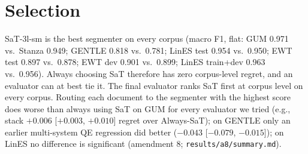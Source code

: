 
\section{Selection}
\label{app:selection}
SaT-3l-sm is the best segmenter on every corpus (macro F1, flat: GUM 0.971 vs.\ Stanza 0.949; GENTLE 0.818 vs.\ 0.781;
LinES test 0.954 vs.\ 0.950; EWT test 0.897 vs.\ 0.878; EWT dev 0.901 vs.\ 0.899; LinES train+dev 0.963 vs.\ 0.956).
Always choosing SaT therefore has zero corpus-level regret, and an evaluator can at best tie it. The final evaluator ranks
SaT first at corpus level on every corpus. Routing each document to the segmenter with the highest score does worse than
always using SaT on GUM for every evaluator we tried (e.g., stack $+0.006$ [$+0.003$, $+0.010$] regret over Always-SaT);
on GENTLE only an earlier multi-system QE regression did better ($-0.043$ [$-0.079$, $-0.015$]); on LinES no difference
is significant (amendment 8; \texttt{results/a8/summary.md}).
